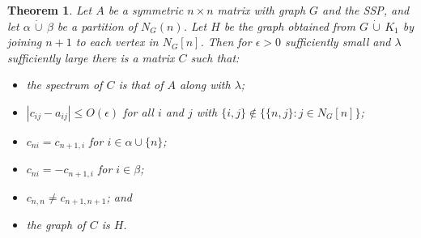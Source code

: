 \documentclass[11pt]{article}
\newtheorem{thm}{Theorem}[section]
\theoremstyle{definition}
\theoremstyle{definition}
\theoremstyle{definition}
\newcommand{\dcup}{\,\dot{\cup}\,}
\begin{document}
\begin{thm}
\label{thm:fixpoint}
Let $A$ be a symmetric $n\times n$ matrix with graph $G$ and the SSP,  and let $\alpha\dcup \beta$ be a partition 
of $N_G(n)$. %
Let $H$ be the graph obtained from $G\dcup K_1$ by joining
$n+1$ to each vertex in $N_G[n]$.  
Then 
for $\epsilon>0$ sufficiently small and $\lambda$ sufficiently 
large there is a matrix $C$ such that: 
\begin{itemize}
\item the spectrum of $C$ is that of $A$ along with $\lambda$; 
\item $|c_{ij}-a_{ij}|\leq O(\epsilon)$  for all $i$ and $j$
with $\{i,j\} \notin \{\{n,j\}: j \in {N_G[n]}\}$;
\item $c_{ni}=c_{n+1,i}$ for $i\in \alpha\cup\{n\}$;
\item $c_{ni}=-c_{n+1,i}$ for $i \in \beta$; 
\item $c_{n,n}\ne c_{n+1,n+1}$; and 
\item the graph of $C$ is $H$.
\end{itemize}
\end{thm}
\end{document}
